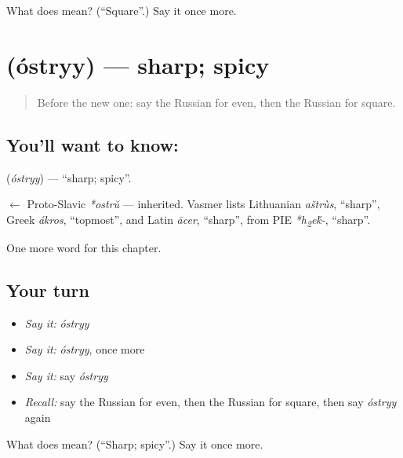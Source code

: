 \begin{tcolorbox}[breakable,colback=teal!4,colframe=teal!35!black,title={Before you move on}]
What does  mean? (\textquotedblleft{}Square\textquotedblright{}.) Say it once more.
\end{tcolorbox}
\section[\texorpdfstring{\ru{острый} (óstryy)}{острый (óstryy)}]{ (óstryy) — sharp; spicy}

\label{lesson:RU-C187-ostryy}



\begin{quote}
Before the new one: say the Russian for even, then the Russian for square.
\end{quote}

\subsection*{You'll want to know: }
\textbf{} (\emph{óstryy}) — \textquotedblleft{}sharp; spicy\textquotedblright{}.

\begin{cousinweb}
\textbf{} $\leftarrow$ Proto-Slavic \emph{*ostrŭ} — inherited. Vasmer lists Lithuanian \emph{aštrùs}, \textquotedblleft{}sharp\textquotedblright{}, Greek \emph{ákros}, \textquotedblleft{}topmost\textquotedblright{}, and Latin \emph{ācer}, \textquotedblleft{}sharp\textquotedblright{}, from PIE \emph{*h\textsubscript{2}e\'{k}-}, \textquotedblleft{}sharp\textquotedblright{}.
\end{cousinweb}

\begin{grammarlens}[title={What you've built}]
One more word for this chapter.
\end{grammarlens}

\subsection*{Your turn}
\begin{itemize}
\raggedright
  \item \emph{Say it:} \emph{óstryy}
  \item \emph{Say it:} \emph{óstryy}, once more
  \item \emph{Say it:} say \emph{óstryy}
  \item \emph{Recall:} say the Russian for even, then the Russian for square, then say \emph{óstryy} again
\end{itemize}

\begin{tcolorbox}[breakable,colback=teal!4,colframe=teal!35!black,title={Before you move on}]
What does  mean? (\textquotedblleft{}Sharp; spicy\textquotedblright{}.) Say it once more.
\end{tcolorbox}

